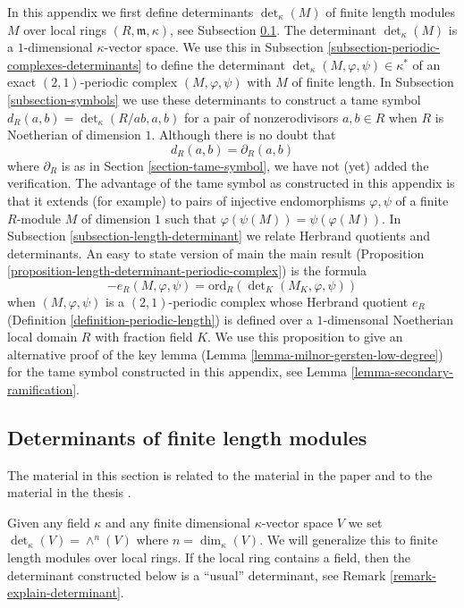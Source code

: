 \noindent
In this appendix we first define determinants $\det_\kappa(M)$
of finite length modules $M$ over local rings $(R, \mathfrak m, \kappa)$,
see Subsection \ref{subsection-determinants-finite-length}.
The determinant $\det_\kappa(M)$ is a $1$-dimensional $\kappa$-vector space.
We use this in Subsection \ref{subsection-periodic-complexes-determinants}
to define the determinant $\det_\kappa(M, \varphi, \psi) \in \kappa^*$
of an exact $(2, 1)$-periodic complex $(M, \varphi, \psi)$
with $M$ of finite length. In Subsection \ref{subsection-symbols}
we use these determinants to construct a tame symbol
$d_R(a, b) = \det_\kappa(R/ab, a, b)$ for a pair of nonzerodivisors
$a, b \in R$ when $R$ is Noetherian of dimension $1$.
Although there is no doubt that
$$
d_R(a, b) = \partial_R(a, b)
$$
where $\partial_R$ is as in Section \ref{section-tame-symbol},
we have not (yet) added the verification. The advantage of the
tame symbol as constructed in this appendix is that it extends
(for example) to pairs of injective endomorphisms $\varphi, \psi$
of a finite $R$-module $M$ of dimension $1$ such that
$\varphi(\psi(M)) = \psi(\varphi(M))$. In
Subsection \ref{subsection-length-determinant}
we relate Herbrand quotients and determinants.
An easy to state version of main the main result
(Proposition \ref{proposition-length-determinant-periodic-complex})
is the formula
$$
-e_R(M, \varphi, \psi) =
\text{ord}_R(\det\nolimits_K(M_K, \varphi, \psi))
$$
when $(M, \varphi, \psi)$ is a $(2, 1)$-periodic complex
whose Herbrand quotient $e_R$ (Definition \ref{definition-periodic-length})
is defined
over a $1$-dimensonal Noetherian local domain $R$ with fraction field $K$.
We use this proposition to give an alternative proof of the key lemma
(Lemma \ref{lemma-milnor-gersten-low-degree})
for the tame symbol constructed in this appendix, see
Lemma \ref{lemma-secondary-ramification}.


\subsection{Determinants of finite length modules}
\label{subsection-determinants-finite-length}

\noindent
The material in this section is related to the material in
the paper \cite{determinant} and to the material in the
thesis \cite{Joe}.

\medskip\noindent
Given any field $\kappa$ and any finite dimensional $\kappa$-vector space
$V$ we set $\det_\kappa(V) = \wedge^n(V)$ where $n = \dim_\kappa(V)$.
We will generalize this to finite length modules over local rings.
If the local ring contains a field, then the determinant constructed
below is a ``usual'' determinant, see
Remark \ref{remark-explain-determinant}.

